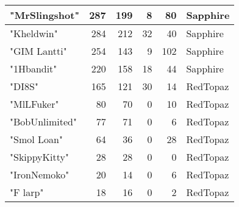 \documentclass{article}
\begin{document}
\begin{table}[htbp]
\begin{tabular}{|l|r|r|r|r|l|}
"MrSlingshot" & 287 & 199 & 8 & 80 & Sapphire \\ \hline
"Kheldwin" & 284 & 212 & 32 & 40 & Sapphire \\ \hline
"GIM Lantti" & 254 & 143 & 9 & 102 & Sapphire \\ \hline
"1Hbandit" & 220 & 158 & 18 & 44 & Sapphire \\ \hline
"DI8S" & 165 & 121 & 30 & 14 & RedTopaz \\ \hline
"MlLFuker" & 80 & 70 & 0 & 10 & RedTopaz \\ \hline
"BobUnlimited" & 77 & 71 & 0 & 6 & RedTopaz \\ \hline
"Smol Loan" & 64 & 36 & 0 & 28 & RedTopaz \\ \hline
"SkippyKitty" & 28 & 28 & 0 & 0 & RedTopaz \\ \hline
"IronNemoko" & 20 & 14 & 0 & 6 & RedTopaz \\ \hline
"F larp" & 18 & 16 & 0 & 2 & RedTopaz \\ \hline
\end{tabular}
\end{table}
\end{document}
